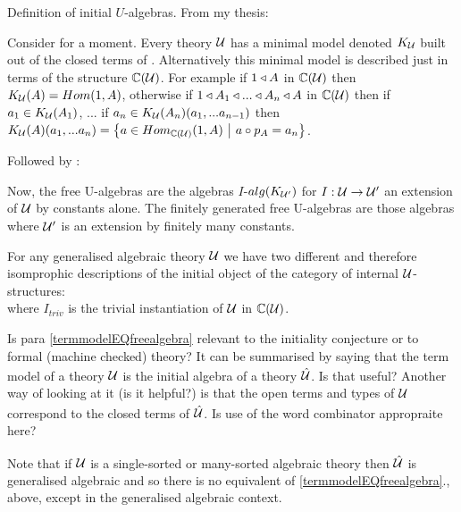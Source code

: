 \note 
Definition of initial $U$-algebras. From my thesis:
\begin{tightquote}
Consider for a moment. Every theory $\gat[U]$ has a minimal model denoted $\KU$ built out of the closed terms of \gat[U]. Alternatively this minimal model is described just in terms of the structure $\CofU$. For example
if $1 \base A$ in $\CofU$ then 
$\KU(A)=Hom(1,A)$, otherwise if $1 \base A_1 \base ... \base A_n \base A$ in $\CofU$
then if $a_1 \in \KU(A_1)$, ... if $a_n \in \KU(A_n)(a_1,...a_{n-1})$ then 
$\KU(A)(a_1,...a_n)=\setsuchthat{a\in Hom_{\CofU}(1,A)}{a \circ p_A = a_n}$. \\
\end{tightquote} 

Followed by :
\begin{tightquote}
Now, the free U-algebras are the algebras $I$-$alg(\KUp)$ for $I: \gat[U] \morph \gat[U']$ an extension of $\gat[U]$ by constants alone. The finitely generated free U-algebras are those algebras where $\gat[U']$ is an extension by finitely many constants. \\
\end{tightquote}

\note
\label{termmodelEQfreealgebra}For any generalised algebraic theory $\gat[U]$ we have two different 
and therefore isomprophic descriptions of the initial object of the category of internal $\gatU$-structures:\\
where $I_{triv}$ is the trivial instantiation of $\gatU$ in $\CofU$.

\note
Is para \ref{termmodelEQfreealgebra} relevant
to the initiality conjecture or to formal (machine checked) theory?  It can be summarised 
by saying that the term model of a theory $\gatU$ is the initial algebra of a theory $\hatU$.
Is that useful? Another way of looking at it (is it helpful?) is that the open terms and types
of $\gatU$ correspond to the closed terms of $\hatU$. 
Is use of the word combinator appropraite here?

\note 
Note that if $\gat[U]$ is a single-sorted or many-sorted algebraic theory then 
$\hatU$ is generalised algebraic 
and so there is no equivalent of \ref{termmodelEQfreealgebra}., above, except in the generalised algebraic context.

